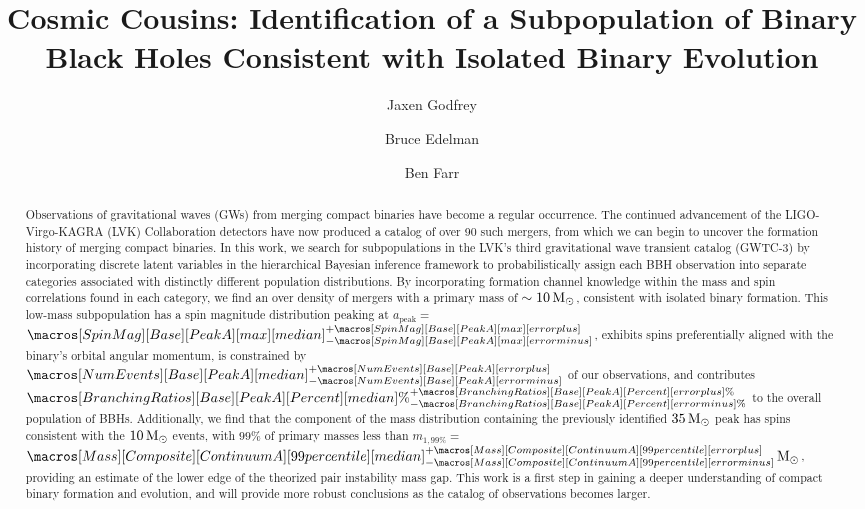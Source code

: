 \documentclass[twocolumn]{aastex631}
\newcommand{\CIPlusMinus}[1]{{#1[median]^{+#1[error plus]}_{-#1[error minus]}}}
\newcommand{\CIPlusMinusPer}[1]{{#1[median]\%^{+#1[error plus]\%}_{-#1[error minus]\%}}}
\newcommand{\msun}{\ensuremath{{\,\rm M}_\odot}}
\newcommand{\result}[1]{\textcolor{BurntOrange}{#1}}
\begin{document}
\title{Cosmic Cousins: Identification of a Subpopulation of Binary Black Holes Consistent with Isolated Binary Evolution}

\author{Jaxen Godfrey}
\author{Bruce Edelman}
\author{Ben Farr}

\begin{abstract}
    Observations of gravitational waves (GWs) from merging compact binaries have become a regular occurrence. The continued advancement of the LIGO-Virgo-KAGRA (LVK) Collaboration detectors have now produced a catalog of over 90 such mergers, from which we can begin to uncover the formation history of merging compact binaries. In this work, we search for subpopulations in the LVK's third gravitational wave transient catalog (GWTC-3) by incorporating discrete latent variables in the hierarchical Bayesian inference framework to probabilistically assign each BBH observation into separate categories associated with distinctly different population distributions. By incorporating formation channel knowledge within the mass and spin correlations found in each category, we find an over density of mergers with a primary mass of $\sim10\msun$, consistent with isolated binary formation. This low-mass subpopulation has a spin magnitude distribution peaking at $a_\mathrm{peak}=$ \result{$\CIPlusMinus{\macros[SpinMag][Base][PeakA][max]}$}, exhibits spins preferentially aligned with the binary's orbital angular momentum, is constrained by \result{$\CIPlusMinus{\macros[NumEvents][Base][PeakA]}$} of our observations, and contributes \result{$\CIPlusMinusPer{\macros[BranchingRatios][Base][PeakA][Percent]}$} to the overall population of BBHs. Additionally, we find that the component of the mass distribution containing the previously identified $35\msun$ peak has spins consistent with the $10\msun$ events, with $99\%$ of primary masses less than $m_{1,99\%} = $ \result{$\CIPlusMinus{\macros[Mass][Composite][ContinuumA][99percentile]}\msun$}, providing an estimate of the lower edge of the theorized pair instability mass gap. This work is a first step in gaining a deeper understanding of compact binary formation and evolution, and will provide more robust conclusions as the catalog of observations becomes larger. 
\end{abstract}
\end{document}
